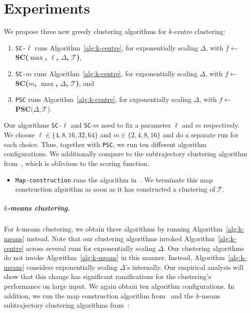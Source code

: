 \documentclass[11pt]{article}
\begin{document}
\section{Experiments}
\label{sec:experiments}
%
We propose three new greedy clustering algorithms for $k$-centre clustering:
%
%
%
\begin{enumerate}
    \item \texttt{SC-}$\ell$ runs Algorithm~\ref{alg:k-centre}, for exponentially scaling $\Delta$, with $f \gets $\textbf{SC($\max$, $\ell$, $\Delta$, $\mathcal{T}$)},
    \item \texttt{SC-}$m$ runs Algorithm~\ref{alg:k-centre}, for exponentially scaling $\Delta$, with $f \gets $ \textbf{SC($m$, $\max$, $\Delta$, $\mathcal{T}$)}, and
    \item \texttt{PSC} runs Algorithm~\ref{alg:k-centre}, for exponentially scaling $\Delta$,  with $f \gets $ $\textbf{PSC}(\Delta, \mathcal{T}$).
\end{enumerate}
%
\noindent
Our algorithms \texttt{SC-}$\ell$ and \texttt{SC}-$m$ need to fix a parameter $\ell$ and $m$ respectively. 
We choose $\ell \in \{ 4, 8, 16, 32, 64 \}$ and $m \in \{ 2, 4, 8, 16 \}$ and do a separate run for each choice. 
Thus, together with \texttt{PSC}, we run ten different algorithm configurations. 
We additionally compare to the subtrajectory clustering algorithm from~\cite{buchin2020improved}, which is oblivious to the scoring function.
%
\begin{itemize}
    \item \texttt{Map-construction} runs the algorithm in~\cite{buchin2020improved}. We terminate this map construction algorithm as soon as it has constructed a clustering of $\mathcal{T}$. 
\end{itemize}
%
\subparagraph{$k$-means clustering.}
For $k$-means clustering, we obtain three algorithms by running Algorithm~\ref{alg:k-means} instead. Note that our clustering algorithms invoked Algorithm~\ref{alg:k-centre} across several runs for exponentially scaling $\Delta$. Our clustering algorithms do not invoke Algorithm~\ref{alg:k-means} in this manner. Instead, Algorithm~\ref{alg:k-means} considers exponentially scaling $\Delta$'s internally.  Our empirical analysis will show that this change has significant ramifications for the clustering's performance on large input.
%
We again obtain ten algorithm configurations. In addition, we run the map construction algorithm from~\cite{buchin2020improved} and the $k$-means subtrajectory clustering algorithms from~\cite{agarwal2018subtrajectory}:
\end{document}
